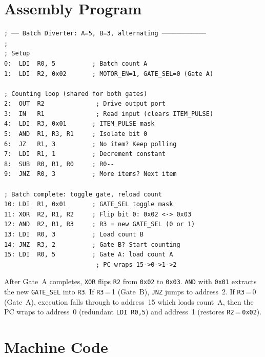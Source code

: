 \documentclass[11pt,a4paper]{article}
\newcommand{\reg}[1]{\texttt{R#1}}
\newcommand{\hex}[1]{\texttt{0x#1}}
\begin{document}
\section{Assembly Program}

\begin{lstlisting}[style=asmstyle]
; ── Batch Diverter: A=5, B=3, alternating ────────────
;
; Setup
0:  LDI  R0, 5          ; Batch count A
1:  LDI  R2, 0x02       ; MOTOR_EN=1, GATE_SEL=0 (Gate A)

; Counting loop (shared for both gates)
2:  OUT  R2              ; Drive output port
3:  IN   R1              ; Read input (clears ITEM_PULSE)
4:  LDI  R3, 0x01       ; ITEM_PULSE mask
5:  AND  R1, R3, R1     ; Isolate bit 0
6:  JZ   R1, 3          ; No item? Keep polling
7:  LDI  R1, 1          ; Decrement constant
8:  SUB  R0, R1, R0     ; R0--
9:  JNZ  R0, 3          ; More items? Next item

; Batch complete: toggle gate, reload count
10: LDI  R1, 0x01       ; GATE_SEL toggle mask
11: XOR  R2, R1, R2     ; Flip bit 0: 0x02 <-> 0x03
12: AND  R2, R1, R3     ; R3 = new GATE_SEL (0 or 1)
13: LDI  R0, 3          ; Load count B
14: JNZ  R3, 2          ; Gate B? Start counting
15: LDI  R0, 5          ; Gate A: load count A
                         ; PC wraps 15->0->1->2
\end{lstlisting}

\begin{notebox}
After Gate~A completes, \texttt{XOR} flips \reg{2} from \hex{02} to
\hex{03}. \texttt{AND} with \hex{01} extracts the new \texttt{GATE\_SEL}
into \reg{3}. If \reg{3}\,=\,1 (Gate~B), \texttt{JNZ} jumps to address~2.
If \reg{3}\,=\,0 (Gate~A), execution falls through to address~15 which
loads count~A, then the PC wraps to address~0 (redundant \texttt{LDI R0,5})
and address~1 (restores \reg{2}\,=\,\hex{02}).
\end{notebox}

\section{Machine Code}
\end{document}
